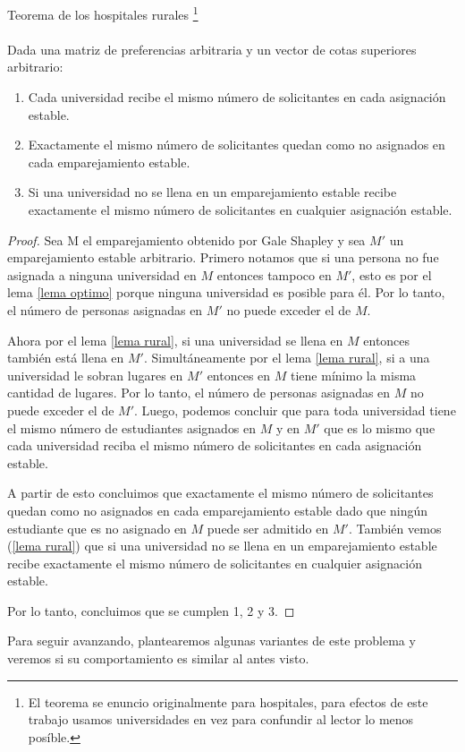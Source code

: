 \begin{teo}{Teorema de los hospitales rurales \footnote{El teorema se enuncio originalmente para hospitales, para efectos de este trabajo usamos universidades en vez para confundir al lector lo menos posíble.} \\ }
\label{rural}
\cite{GaleSotomayor}\\
Dada una matriz de preferencias arbitraria y un vector de cotas superiores arbitrario:
\begin{enumerate}
\item Cada universidad recibe el mismo número de solicitantes en cada asignación estable.
\item Exactamente el mismo número de solicitantes quedan como no asignados en cada emparejamiento estable. 
\item Si una universidad no se llena en un emparejamiento estable recibe exactamente el mismo número de solicitantes en cualquier asignación estable. 
\end{enumerate}
\end{teo}
\begin{proof}
Sea M el emparejamiento obtenido por Gale Shapley y sea $M'$ un emparejamiento estable arbitrario. Primero notamos que si una persona no fue asignada a ninguna universidad en $M$ entonces tampoco en $M'$, esto es por el lema \ref{lema optimo} porque ninguna universidad es posible para él. Por lo tanto, el número de personas asignadas en $M'$ no puede exceder el de $M$. 

Ahora por el lema \ref{lema rural}, si una universidad se llena en $M$ entonces también está llena en $M'$. Simultáneamente por el lema \ref{lema rural}, si a una universidad le sobran lugares en $M'$ entonces en $M$ tiene mínimo la misma cantidad de lugares. Por lo tanto, el número de personas asignadas en $M$ no puede exceder el de $M'$. Luego, podemos concluir que para toda universidad tiene el mismo número de estudiantes asignados en $M$ y en $M'$ que es lo mismo que cada universidad reciba el mismo número de solicitantes en cada asignación estable. 

A partir de esto concluimos que exactamente el mismo número de solicitantes quedan como no asignados en cada emparejamiento estable dado que ningún estudiante que es no asignado en $M$ puede ser admitido en $M'$. También vemos (\ref{lema rural}) que si una universidad no se llena en un emparejamiento estable recibe exactamente el mismo número de solicitantes en cualquier asignación estable. 

Por lo tanto, concluimos que se cumplen 1, 2 y 3.
\end{proof}

Para seguir avanzando, plantearemos algunas variantes de este problema y veremos si su comportamiento es similar al antes visto. 

